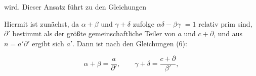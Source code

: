 
wird. Dieser Ansatz führt zu den Gleichungen


Hiermit ist zunächst, da $\alpha+\beta$ und $\gamma+\delta$ zufolge $\alpha\delta-\beta\gamma$
$= 1$ relativ prim sind, $\partial'$ bestimmt als der größte gemeinschaftliche
 Teiler von $a$ und $c+\partial$, und aus $n = a'\partial'$ ergibt sich $a'$.
Dann ist nach den Gleichungen (6):

\[
\alpha+\beta = \frac{a}{\partial'}, \qquad \gamma+\delta = \frac{c+\partial}{\beta'}, %
\]
